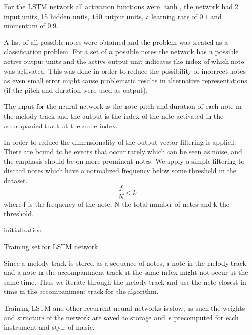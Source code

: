 For the LSTM network all activation functions were $\tanh$, the network had 2 input units, 15 hidden units, $150$ output units, a learning rate of $0.1$ and momentum of $0.9$.

A list of all possible notes were obtained and the problem was treated as a classification problem. For a set of $n$ possible notes the network has $n$ possible active output units and the active output unit indicates the index of which note was activated. This was done in order to reduce the possibility of incorrect notes as even small error might cause problematic results in alternative representations (if the pitch and duration were used as output).

The input for the neural network is the note pitch and duration of each note in the melody track and the output is the index of the note activated in the accompanied track at the same index.

In order to reduce the dimensionality of the output vector filtering is applied. There are bound to be events that occur rarely which can be seen as noise, and the emphasis should be on more prominent notes.
We apply a simple filtering to discard notes which have a normalized frequency below some threshold in the dataset.
\[ \frac{f}{N} < k \]
where f is the frequency of the note, N the total number of notes and k the threshold.

\begin{algorithm}
 initialization\;
 
\caption{Training set for LSTM network}
\end{algorithm}
Since a melody track is stored as a sequence of notes, a note in the melody track and a note in the accompaniment track at the same index might not occur at the same time. Thus we iterate through the melody track and use the note closest in time in the accompaniment track for the algorithm.

Training LSTM and other recurrent neural networks is slow, as such the weights and structure of the network are saved to storage and is precomputed for each instrument and style of music.

